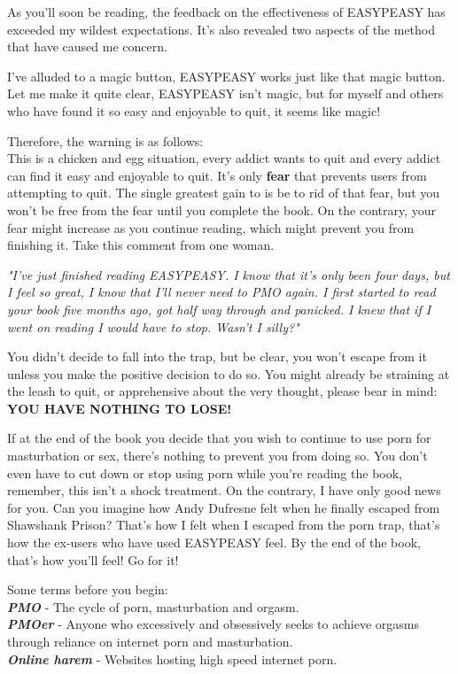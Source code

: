\documentclass[easypeasy.tex]{subfiles}
\begin{document}
As you'll soon be reading, the feedback on the effectiveness of EASYPEASY has exceeded my wildest expectations. It's also revealed two aspects of the method that have caused me concern. 

I've alluded to a magic button, EASYPEASY works just like that magic button. Let me make it quite clear, EASYPEASY isn't magic, but for myself and others who have found it so easy and enjoyable to quit, it seems like magic!

Therefore, the warning is as follows:\\
This is a chicken and egg situation, every addict wants to quit and every addict can find it easy and enjoyable to quit. It's only \textbf{fear} that prevents users from attempting to quit. The single greatest gain to is be to rid of that fear, but you won't be free from the fear until you complete the book. On the contrary, your fear might increase as you continue reading, which might prevent you from finishing it. Take this comment from one woman.

\textit{\textit{"I've just finished reading EASYPEASY. I know that it's only been four days, but I feel so great, I know that I'll never need to PMO again. I first started to read your book five months ago, got half way through and panicked. I knew that if I went on reading I would have to stop. Wasn't I silly?"}}

You didn't decide to fall into the trap, but be clear, you won't escape from it unless you make the positive decision to do so. You might already be straining at the leash to quit, or apprehensive about the very thought, please bear in mind: 
\textbf{YOU HAVE NOTHING TO LOSE!}

If at the end of the book you decide that you wish to continue to use porn for masturbation or sex, there's nothing to prevent you from doing so. You don't even have to cut down or stop using porn while you're reading the book, remember, this isn't a shock treatment. On the contrary, I have only good news for you. Can you imagine how Andy Dufresne felt when he finally escaped from Shawshank Prison? That's how I felt when I escaped from the porn trap, that's how the ex-users who have used EASYPEASY feel. By the end of the book, that's how you'll feel! Go for it!

Some terms before you begin:\\
{\small \textbf{\textit{PMO}} - The cycle of porn, masturbation and orgasm.\\
  \textbf{\textit{PMOer}} - Anyone who excessively and obsessively seeks to achieve orgasms through reliance on internet porn and masturbation.\\
  \textbf{\textit{Online harem}} - Websites hosting high speed internet porn.
  }
\end{document}
